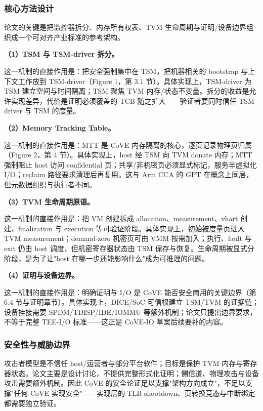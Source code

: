 \documentclass[11pt]{ctexart}
\begin{document}
\subsubsection{核心方法设计}
论文的关键是把监控器拆分、内存所有权表、TVM 生命周期与证明/设备边界组织成一个可对齐产业标准的参考架构。\par
\noindent\textbf{（1）TSM 与 TSM-driver 拆分。}\par
这一机制的直接作用是：把安全强制集中在 TSM，把机器相关的 bootstrap 与上下文工作放到 TSM-driver（Figure 1，第 3.1 节）。具体实现上，TSM-driver 为 TSM 建立空间与时间隔离；TSM 聚焦 TVM 内存/状态不变量。拆分的收益是允许实现差异，代价是证明必须覆盖的 TCB 随之扩大——验证者要同时信任 TSM-driver 与 TSM 的度量。\par
\noindent\textbf{（2）Memory Tracking Table。}\par
这一机制的直接作用是：MTT 是 CoVE 内存隔离的核心，逐页记录物理页归属（Figure 2，第 4 节）。具体实现上，host 经 TSM 向 TVM donate 内存；MTT 强制阻止 host 访问 confidential 页；共享/非机密页必须显式标记，服务半虚拟化 I/O；reclaim 路径要求清理后再复用。这与 Arm CCA 的 GPT 在概念上同层，但元数据组织与执行者不同。\par
\noindent\textbf{（3）TVM 生命周期原语。}\par
这一机制的直接作用是：把 VM 创建拆成 allocation、measurement、vhart 创建、finalization 与 execution 等可验证阶段。具体实现上，初始被度量页进入 TVM measurement；demand-zero 机密页可由 VMM 按需加入；执行、fault 与 exit 仍由 host 调度，但机密寄存器状态由 TSM 保存与恢复。生命周期被显式分阶段，是为了让"host 在哪一步还能影响什么"成为可推理的问题。\par
\noindent\textbf{（4）证明与设备边界。}\par
这一机制的直接作用是：明确证明与 I/O 是 CoVE 能否安全商用的关键边界（第 6.4 节与证明章节）。具体实现上，DICE/SoC 可信根建立 TSM/TVM 的证据链；设备挂接需要 SPDM/TDISP/IDE/IOMMU 等额外机制；论文只提出边界要求，不等于完整 TEE-I/O 标准——这正是 CoVE-IO 草案后续要补的内容。\par
\subsubsection{安全性与威胁边界}
攻击者模型是不信任 host/运营者与部分平台软件；目标是保护 TVM 内存与寄存器状态。论文主要是设计讨论，不提供完整形式化证明；侧信道、物理攻击与设备攻击需要额外机制。因此 CoVE 的安全论证足以支撑"架构方向成立"，不足以支撑"任何 CoVE 实现安全"——实现层的 TLB shootdown、页转换竞态与中断绑定都需要独立验证。\par
\end{document}
